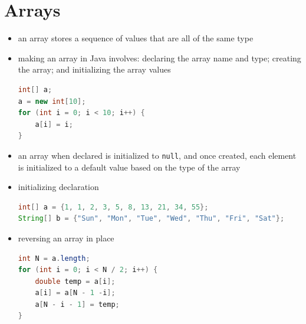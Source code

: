 \documentclass[8pt,a4paper,compress]{beamer}
\begin{document}
\section{Arrays}
\begin{frame}[fragile]
\begin{itemize}
\item an array stores a sequence of values that are all of the same type 

\item making an array in Java involves: declaring the array name and type; creating the array; and initializing the array values
\begin{lstlisting}[language=Java]
int[] a;
a = new int[10];
for (int i = 0; i < 10; i++) {
    a[i] = i;
}
\end{lstlisting}

\item an array when declared is initialized to \lstinline{null}, and once created, each element is initialized to a default value based on the type of the array

\item initializing declaration
\begin{lstlisting}[language=Java]
int[] a = {1, 1, 2, 3, 5, 8, 13, 21, 34, 55};
String[] b = {"Sun", "Mon", "Tue", "Wed", "Thu", "Fri", "Sat"};
\end{lstlisting}

\item reversing an array in place
\begin{lstlisting}[language=Java]
int N = a.length;
for (int i = 0; i < N / 2; i++) {
    double temp = a[i];
    a[i] = a[N - 1 -i];
    a[N - i - 1] = temp;
}
\end{lstlisting}

\end{itemize}
\end{frame}
\end{document}
